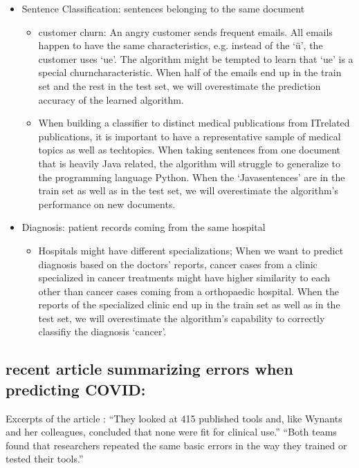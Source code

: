 \documentclass[letterpaper,10pt,english]{jupyterBook}
\begin{document}
\begin{itemize}
\item {} 
\sphinxAtStartPar
Sentence Classification: sentences belonging to the same document
\begin{itemize}
\item {} 
\sphinxAtStartPar
customer churn: An angry customer sends frequent e\sphinxhyphen{}mails. All e\sphinxhyphen{}mails happen to have the same characteristics, e.g. instead of the  ‘ü’, the customer uses ‘ue’. The algorithm might be tempted to learn that ‘ue’ is a special churn\sphinxhyphen{}characteristic. When half of the e\sphinxhyphen{}mails end up in the train set and the rest in the test set, we will overestimate the prediction accuracy of the learned algorithm.

\item {} 
\sphinxAtStartPar
When building a classifier to distinct medical publications from IT\sphinxhyphen{}related publications, it is important to have a representative sample of medical topics as well as tech\sphinxhyphen{}topics. When taking sentences from one document that is heavily Java related, the algorithm will struggle to generalize to the programming language Python. When the ‘Java\sphinxhyphen{}sentences’ are in the train set as well as in the test set, we will overestimate the algorithm’s performance on new documents.

\end{itemize}

\item {} 
\sphinxAtStartPar
Diagnosis: patient records coming from the same hospital
\begin{itemize}
\item {} 
\sphinxAtStartPar
Hospitals might have different specializations; When we want to predict diagnosis based on the doctors’ reports, cancer cases from a clinic specialized in cancer treatments might have higher similarity to each other than cancer cases coming from a orthopaedic hospital. When the reports of the specialized clinic end up in the train set as well as in the test set, we will overestimate the algorithm’s capability to correctly classifiy the diagnosis ‘cancer’.

\end{itemize}

\end{itemize}


\subsection{recent article summarizing errors when predicting COVID:}
\label{\detokenize{dependent_data:recent-article-summarizing-errors-when-predicting-covid}}
\sphinxAtStartPar
Excerpts of the article :
“They looked at 415 published tools and, like Wynants and her colleagues, concluded that none were fit for clinical use.”
“Both teams found that researchers repeated the same basic errors in the way they trained or tested their tools.”
\end{document}
